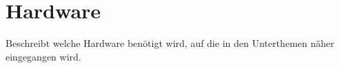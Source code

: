 \section{Hardware}\label{sec:hardware}

Beschreibt welche Hardware benötigt wird, auf die in den Unterthemen näher eingegangen wird.
